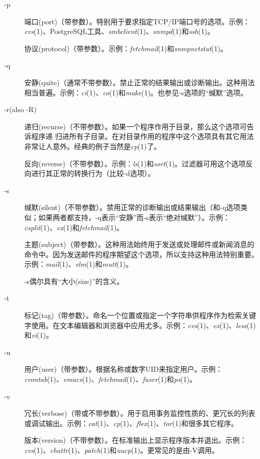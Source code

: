 \documentclass[12pt,oneside]{book}
\begin{document}
\begin{common-format}
\begin{description}
\item[-p] 端口(port)（带参数）。特别用于要求指定TCP/IP端口号的选项。示例：\textit{cvs}(1)、PostgreSQL工具、\textit{smbclient}(1)、\textit{snmpd}(1)和\textit{ssh}(1)。

协议(protocol)（带参数）。示例：\textit{fetchmail}(1)和\textit{snmpnetstat}(1)。

\item[-q] 安静(quite)（通常不带参数）。禁止正常的结果输出或诊断输出。这种用法相当普遍。示例：\textit{ci}(1)、\textit{co}(1)和\textit{make}(1)。也参见-s选项的“缄默”选项。

\item[-r(also -R)] 递归(recurse)（不带参数）。如果一个程序作用于目录，那么这个选项可告诉程序递
归进所有子目录。在对目录作用的程序中这个选项具有其它用法非常让人意外。经典的例子当然是\textit{cp}(1)了。

反向(reverse)（不带参数）。示例：\textit{ls}(1)和\textit{sort}(1)。过滤器可用这个选项反向进行其正常的转换行为（比较-d选项）。

\item[-s] 缄默(silent)（不带参数）。禁用正常的诊断输出或结果输出（和-q选项类似；如果两者都支持，-q表示“安静”而-s表示“绝对缄默”）。示例：\textit{csplit}(1)、\textit{ex}(1)和\textit{fetchmail}(1)。

主题(subject)（带参数）。这种用法始终用于发送或处理邮件或新闻消息的命令中。因为发送邮件的程序期望这个选项，所以支持这种用法特别重要。示例：\textit{mail}(1)、\textit{elm}(1)和\textit{mutt}(1)。

-s偶尔具有“大小(size)”的含义。

\item[-t] 标记(tag)（带参数）。命名一个位置或指定一个字符串供程序作为检索关键字使用。在文本编辑器和浏览器中应用尤多。示例：\textit{cvs}(1)、\textit{ex}(1)、\textit{less}(1)和\textit{vi}(1)。

\item[-u] 用户(user)（带参数）。根据名称或数字UID来指定用户。示例：\textit{crontab}(1)、\textit{emacs}(1)、\textit{fetchmail}(1)、\textit{fuser}(1)和\textit{ps}(1)。

\item[-v] 冗长(verbose)（带或不带参数）。用于启用事务监控性质的、更冗长的列表或调试输出。示例：\textit{cat}(1)、\textit{cp}(1)、\textit{flex}(1)、\textit{tar}(1)和很多其它程序。

版本(version)（不带参数）。在标准输出上显示程序版本并退出。示例：\textit{cvs}(1)、\textit{chattr}(1)、\textit{patch}(1)和\textit{uucp}(1)。更常见的是由-V调用。


\end{description}
\end{common-format}
\end{document}
